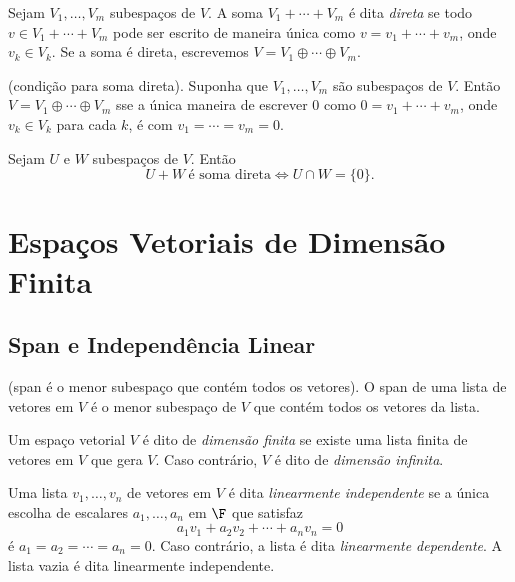 \documentclass{article}
\begin{document}
\begin{defn}
    Sejam \(V_1, \ldots, V_m\) subespaços de \(V\). A soma \(V_1 + \cdots + V_m\) é dita \emph{direta} se todo \(v \in V_1 + \cdots + V_m\) pode ser escrito de maneira única como \(v = v_1 + \cdots + v_m\), onde \(v_k \in V_k\). Se a soma é direta, escrevemos \(V = V_1 \oplus \cdots \oplus V_m\).
\end{defn}

\begin{prop} (condição para soma direta).
    Suponha que \(V_1, \ldots, V_m\) são subespaços de \(V\). Então \(V = V_1 \oplus \cdots \oplus V_m\) sse a única maneira de escrever \(0\) como \(0 = v_1 + \cdots + v_m\), onde \(v_k \in V_k\) para cada \(k\), é com \(v_1 = \cdots = v_m = 0\).
\end{prop}

\begin{prop}
    Sejam \(U\) e \(W\) subespaços de \(V\). Então \[U + W \ \text{é soma direta} \iff U \cap W = \{0\}.\]
\end{prop}

\section{Espaços Vetoriais de Dimensão Finita}

\subsection{Span e Independência Linear}
\begin{prop} (span é o menor subespaço que contém todos os vetores).
    O span de uma lista de vetores em \(V\) é o menor subespaço de \(V\) que contém todos os vetores da lista.
\end{prop}

\begin{defn}
    Um espaço vetorial \(V\) é dito de \emph{dimensão finita} se existe uma lista finita de vetores em \(V\) que gera \(V\). Caso contrário, \(V\) é dito de \emph{dimensão infinita}.
\end{defn}

\begin{defn}
    Uma lista \(v_1, \ldots, v_n\) de vetores em \(V\) é dita \emph{linearmente independente} se a única escolha de escalares \(a_1, \ldots, a_n\) em \(\F\) que satisfaz
    \begin{equation}
        a_1 v_1 + a_2 v_2 + \cdots + a_n v_n = 0
    \end{equation}
    \noindent é \(a_1 = a_2 = \cdots = a_n = 0\). Caso contrário, a lista é dita \emph{linearmente dependente}. A lista vazia é dita linearmente independente.
\end{defn}
\end{document}
